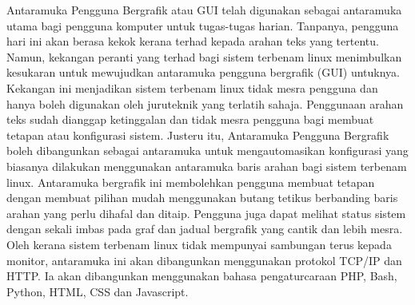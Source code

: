\begin{abstrak}
Antaramuka Pengguna Bergrafik atau GUI telah digunakan sebagai antaramuka utama bagi pengguna komputer untuk tugas-tugas harian. Tanpanya, pengguna hari ini akan berasa kekok kerana terhad kepada arahan teks yang tertentu. Namun, kekangan peranti yang terhad bagi sistem terbenam linux menimbulkan kesukaran untuk mewujudkan antaramuka pengguna bergrafik (GUI) untuknya. Kekangan ini menjadikan sistem terbenam linux tidak mesra pengguna dan hanya boleh digunakan oleh juruteknik yang terlatih sahaja. Penggunaan arahan teks sudah dianggap ketinggalan dan tidak mesra pengguna bagi membuat tetapan atau konfigurasi sistem. Justeru itu, Antaramuka Pengguna Bergrafik boleh dibangunkan sebagai antaramuka untuk mengautomasikan konfigurasi yang biasanya dilakukan menggunakan antaramuka baris arahan bagi sistem terbenam linux. Antaramuka bergrafik ini membolehkan pengguna membuat tetapan dengan membuat pilihan mudah menggunakan butang tetikus berbanding baris arahan yang perlu dihafal dan ditaip. Pengguna juga dapat melihat status sistem dengan sekali imbas pada graf dan jadual bergrafik yang cantik dan lebih mesra. Oleh kerana sistem terbenam linux tidak mempunyai sambungan terus kepada monitor, antaramuka ini akan dibangunkan menggunakan protokol TCP/IP dan HTTP. Ia akan dibangunkan menggunakan bahasa pengaturcaraan PHP, Bash, Python, HTML, CSS dan Javascript.

\end{abstrak}
